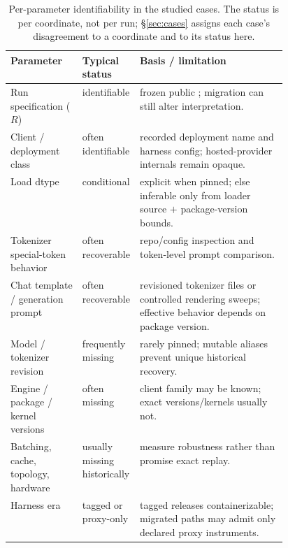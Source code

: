 \begin{table}[t]
\centering\small
\begin{tabularx}{\linewidth}{@{}p{0.26\linewidth}p{0.20\linewidth}Y@{}}
\toprule
\textbf{Parameter} & \textbf{Typical status} & \textbf{Basis / limitation} \\
\midrule
Run specification ($R$) & identifiable & frozen public ;
migration can still alter interpretation. \\
Client / deployment class & often identifiable & recorded deployment name and
harness config; hosted-provider internals remain opaque. \\
Load dtype & conditional & explicit when pinned; else inferable only from loader
source $+$ package-version bounds. \\
Tokenizer special-token behavior & often recoverable & repo/config inspection and
token-level prompt comparison. \\
Chat template / generation prompt & often recoverable & revisioned tokenizer files
or controlled rendering sweeps; effective behavior depends on package version. \\
Model / tokenizer revision & frequently missing & rarely pinned; mutable aliases
prevent unique historical recovery. \\
Engine / package / kernel versions & often missing & client family may be known;
exact versions/kernels usually not. \\
Batching, cache, topology, hardware & usually missing historically & measure
robustness rather than promise exact replay. \\
Harness era & tagged or proxy-only & tagged releases containerizable; migrated
paths may admit only declared proxy instruments. \\
\bottomrule
\end{tabularx}
\caption{Per-parameter identifiability in the studied cases. The status is per
coordinate, not per run; \S\ref{sec:cases} assigns each case's disagreement to a
coordinate and to its status here.}
\label{tab:identifiability}
\end{table}
